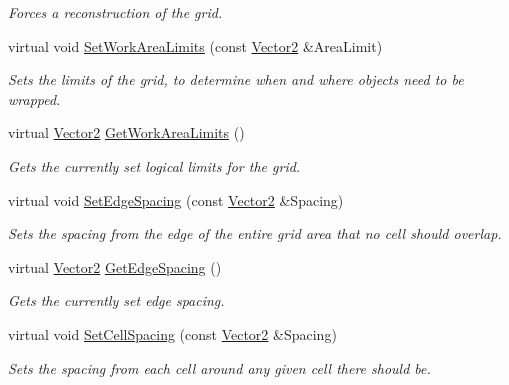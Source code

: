 \begin{DoxyCompactItemize}
\begin{DoxyCompactList}\small\item\em Forces a reconstruction of the grid. \item\end{DoxyCompactList}\item 
virtual void \hyperlink{classphys_1_1UI_1_1CellGrid_a785a41fd3e38dbd5a58d9a4f72f06a26}{SetWorkAreaLimits} (const \hyperlink{classphys_1_1Vector2}{Vector2} \&AreaLimit)
\begin{DoxyCompactList}\small\item\em Sets the limits of the grid, to determine when and where objects need to be wrapped. \item\end{DoxyCompactList}\item 
virtual \hyperlink{classphys_1_1Vector2}{Vector2} \hyperlink{classphys_1_1UI_1_1CellGrid_a328392c90b93da93354756607e328e0c}{GetWorkAreaLimits} ()
\begin{DoxyCompactList}\small\item\em Gets the currently set logical limits for the grid. \item\end{DoxyCompactList}\item 
virtual void \hyperlink{classphys_1_1UI_1_1CellGrid_aa55c328e2d222570d5c72bb50a48f8a5}{SetEdgeSpacing} (const \hyperlink{classphys_1_1Vector2}{Vector2} \&Spacing)
\begin{DoxyCompactList}\small\item\em Sets the spacing from the edge of the entire grid area that no cell should overlap. \item\end{DoxyCompactList}\item 
virtual \hyperlink{classphys_1_1Vector2}{Vector2} \hyperlink{classphys_1_1UI_1_1CellGrid_afcf2689f1cc38acb157deb8ee5717906}{GetEdgeSpacing} ()
\begin{DoxyCompactList}\small\item\em Gets the currently set edge spacing. \item\end{DoxyCompactList}\item 
virtual void \hyperlink{classphys_1_1UI_1_1CellGrid_ac62bf02320f381012d22941d07ae62a2}{SetCellSpacing} (const \hyperlink{classphys_1_1Vector2}{Vector2} \&Spacing)
\begin{DoxyCompactList}\small\item\em Sets the spacing from each cell around any given cell there should be. \item\end{DoxyCompactList}\item 

\end{DoxyCompactItemize}
